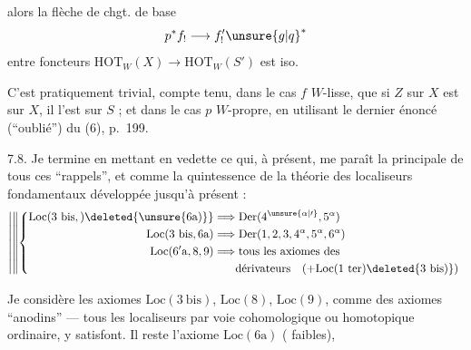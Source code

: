alors la flèche de chgt. de base
\[
p^{\ast}f_{!}\longrightarrow f'_{!}\unsure{g|q}^{\ast}
\]
entre foncteurs $\mathrm{HOT}_{W}(X)\longrightarrow\mathrm{HOT}_{W}(S')$ est iso.

C'est pratiquement trivial, compte tenu, dans
le cas $f$ $W$-lisse, que si $Z$ sur $X$ est  sur $X$,
il l'est sur $S$ ; et dans le cas $p$ $W$-propre, en
utilisant le dernier énoncé (``oublié'') du (6),
p.~199.

7.8. Je termine en mettant en vedette
ce qui, à présent, me paraît la
  principale de tous ces ``rappels'', et
comme la quintessence de la théorie des localiseurs
fondamentaux développée jusqu'à présent :
\[
\left|\left\Vert\left\{\begin{aligned}
\mathrm{Loc}(3\ \mathrm{bis},)\deleted{\unsure{6\mathrm{a})}}&\Longrightarrow\mathrm{Der}(4^{\unsure{\alpha|\prime}},5^{\alpha})\\
\mathrm{Loc}(3\ \mathrm{bis},6\mathrm{a})&\Longrightarrow\mathrm{Der}(1,2,3,4^{\alpha},5^{\alpha},6^{\alpha})\\
\mathrm{Loc}(6'\mathrm{a},8,9)&\Longrightarrow\text{tous les axiomes des}\\
&\hphantom{\Longrightarrow{}}\text{dérivateurs}\quad(+\mathrm{Loc}(1\ \mathrm{ter})\deleted{3\ \mathrm{bis})})
\end{aligned}\right.\right.\right.
\]

Je considère les axiomes $\mathrm{Loc}(3\ \mathrm{bis})$,
$\mathrm{Loc}(8)$, $\mathrm{Loc}(9)$, comme des axiomes
``anodins'' --- tous les localiseurs 
 par voie cohomologique ou homotopique
ordinaire, y satisfont. Il reste l'axiome
$\mathrm{Loc}(6\mathrm{a})$    ( faibles),
